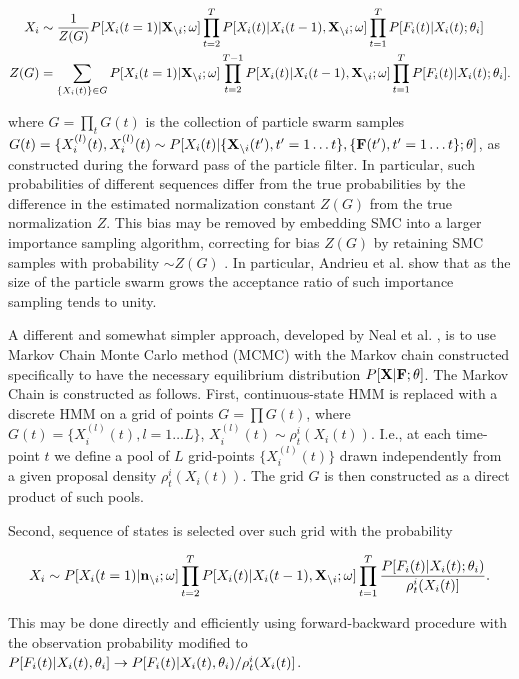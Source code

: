 \begin{align}
X_i &\sim \frac{1}{Z(G)} P[X_i(t=1)|{\bf X}_{\backslash i}; \mathbf{\omega}]\prod\limits_{t=2}^{T}P[X_i(t)|X_i(t-1), {\bf X}_{\backslash i}; \mathbf{\omega}] \prod_{t=1}^{T} P[F_i(t)|X_i(t); \mathbf{\theta}_i] \\
Z(G) &= \sum_{\{X_i(t)\}\in G} P[X_i(t=1)|{\bf X}_{\backslash i}; \mathbf{\omega}] \prod_{t=2}^{T-1}P[X_i(t)|X_i(t-1), {\bf X}_{\backslash i}; \mathbf{\omega}] \prod_{t=1}^{T}P[F_i(t)|X_i(t); \mathbf{\theta}_i].
\end{align}

\noindent where $G=\prod\limits_t G(t)$ is the collection of particle swarm samples $G(t)=\{X_i^{(l)}(t), X_i^{(l)}(t) \sim P[X_i(t)|\{{\bf X}_{\backslash i}(t'),t'=1\ldots t\},\{{\bf F}(t'),t'=1\ldots t\};\theta]$, as constructed during the forward pass of the particle filter.  In particular, such probabilities of different sequences differ from the true probabilities by the difference in the estimated normalization constant $Z(G)$ from the true normalization $Z$.  This bias may be removed by embedding SMC into a larger importance sampling algorithm, correcting for bias $Z(G)$ by retaining SMC samples with probability $\sim Z(G)$ \cite{Andrieu2007}. In particular, Andrieu et al. \cite{Andrieu2007} show that as the size of the particle swarm grows the acceptance ratio of such importance sampling tends to unity.

A different and somewhat simpler approach, developed by Neal et al. \cite{NBR03}, is to use Markov Chain Monte Carlo method (MCMC) with the Markov chain constructed specifically to have the necessary equilibrium distribution $P[{\bf X}| {\bf F}; \theta]$. The Markov Chain is constructed as follows. First, continuous-state HMM is replaced with a discrete HMM on a grid of points $G=\prod G(t)$, where $G(t) = \{X_i^{(l)}(t), l=1\ldots L\}$, $X_i^{(l)}(t)\sim \rho^i_t(X_i(t))$. I.e., at each time-point $t$ we define a pool of $L$ grid-points $\{X_i^{(l)}(t)\}$ drawn independently from a given proposal density $\rho^i_t(X_i(t))$. The grid $G$ is then constructed as a direct product of such pools.

Second, sequence of states is selected over such grid with the probability

\begin{equation}\label{eqn:nealprob}
X_i\sim P[X_i(t=1)|{\bf n}_{\backslash i}; \mathbf{\omega}]\prod\limits_{t=2}^{T}P[X_i(t)|X_i(t-1), {\bf X}_{\backslash i}; \mathbf{\omega}] \prod\limits_{t=1}^{T}
\frac{P[F_i(t)|X_i(t); \mathbf{\theta}_i)}{\rho^i_t(X_i(t)]}.
\end{equation}

This may be done directly and efficiently using forward-backward procedure with the observation probability modified to $P[F_i(t)|X_i(t), \mathbf{\theta}_i]\rightarrow P[F_i(t)|X_i(t), \mathbf{\theta}_i)/{\rho^i_t(X_i(t)]}$.

